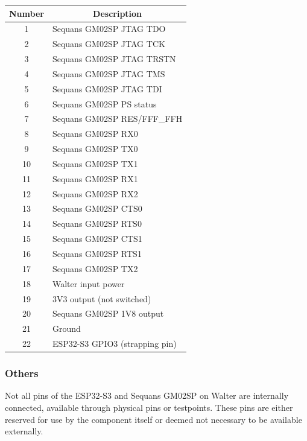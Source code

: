 \documentclass[11pt]{article}
\begin{document}
\begin{center}
\begin{tabular}{|c|p{9.5cm}|}
    \hline
    {\bf Number} & \multicolumn{1}{c|}{\bf Description} \\
    \hline
    \hline
    1 & Sequans GM02SP JTAG TDO\\
    \hline
    2 & Sequans GM02SP JTAG TCK\\
    \hline
    3 & Sequans GM02SP JTAG TRSTN\\
    \hline
    4 & Sequans GM02SP JTAG TMS\\
    \hline
    5 & Sequans GM02SP JTAG TDI\\
    \hline
    6 & Sequans GM02SP PS status\\
    \hline
    7 & Sequans GM02SP RES/FFF\_FFH \\
    \hline
    8 & Sequans GM02SP RX0 \\
    \hline
    9 & Sequans GM02SP TX0 \\
    \hline
    10 & Sequans GM02SP TX1 \\
    \hline
    11 & Sequans GM02SP RX1 \\
    \hline
    12 & Sequans GM02SP RX2 \\
    \hline
    13 & Sequans GM02SP CTS0 \\
    \hline
    14 & Sequans GM02SP RTS0 \\ 
    \hline
    15 & Sequans GM02SP CTS1 \\
    \hline
    16 & Sequans GM02SP RTS1 \\
    \hline
    17 & Sequans GM02SP TX2 \\
    \hline
    18 & Walter input power \\
    \hline
    19 & 3V3 output (not switched) \\
    \hline
    20 & Sequans GM02SP 1V8 output \\
    \hline
    21 & Ground \\
    \hline
    22 & ESP32-S3 GPIO3 (strapping pin)\\
    \hline
\end{tabular}
\end{center}

\subsubsection{Others}
Not all pins of the ESP32-S3 and Sequans GM02SP on Walter are internally connected, available through physical pins or testpoints. These pins are either reserved for use by the component itself or deemed not necessary to be available externally.
\end{document}
